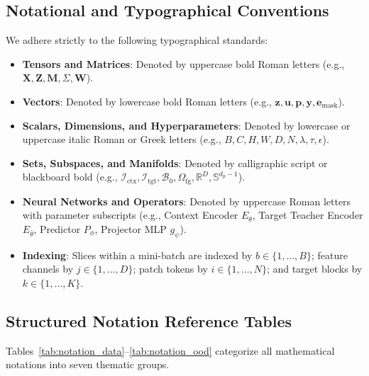 \documentclass{article}
\begin{document}
\subsection{Notational and Typographical Conventions}
We adhere strictly to the following typographical standards:
\begin{itemize}
    \item \textbf{Tensors and Matrices}: Denoted by uppercase bold Roman letters (e.g., $\mathbf{X}, \mathbf{Z}, \mathbf{M}, \Sigma, \mathbf{W}$).
    \item \textbf{Vectors}: Denoted by lowercase bold Roman letters (e.g., $\mathbf{z}, \mathbf{u}, \mathbf{p}, \mathbf{y}, \mathbf{e}_{\text{mask}}$).
    \item \textbf{Scalars, Dimensions, and Hyperparameters}: Denoted by lowercase or uppercase italic Roman or Greek letters (e.g., $B, C, H, W, D, N, \lambda, \tau, \epsilon$).
    \item \textbf{Sets, Subspaces, and Manifolds}: Denoted by calligraphic script or blackboard bold (e.g., $\mathcal{I}_{\text{ctx}}, \mathcal{I}_{\text{tgt}}, \mathcal{B}_0, \Omega_{\text{fg}}, \mathbb{R}^D, \mathbb{S}^{d_p - 1}$).
    \item \textbf{Neural Networks and Operators}: Denoted by uppercase Roman letters with parameter subscripts (e.g., Context Encoder $E_\theta$, Target Teacher Encoder $E_{\bar{\theta}}$, Predictor $P_\phi$, Projector MLP $g_\psi$).
    \item \textbf{Indexing}: Slices within a mini-batch are indexed by $b \in \{1, \dots, B\}$; feature channels by $j \in \{1, \dots, D\}$; patch tokens by $i \in \{1, \dots, N\}$; and target blocks by $k \in \{1, \dots, K\}$.
\end{itemize}

\subsection{Structured Notation Reference Tables}

Tables~\ref{tab:notation_data}--\ref{tab:notation_ood} categorize all mathematical notations into seven thematic groups.
\end{document}
